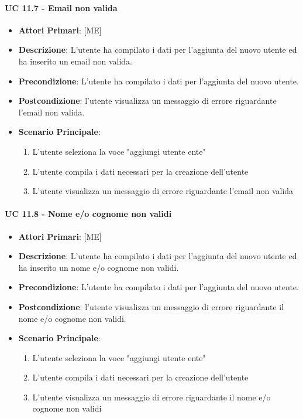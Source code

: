 			\paragraph{UC 11.7 - Email non valida}
			\begin{itemize}
				\item \textbf{Attori Primari}: [ME]
				\item \textbf{Descrizione}: L'utente ha compilato i dati per l'aggiunta del nuovo utente ed ha inserito un email non valida.
				\item \textbf{Precondizione}: L'utente ha compilato i dati per l'aggiunta del nuovo utente.
				\item \textbf{Postcondizione}: l'utente visualizza un messaggio di errore riguardante l'email non valida.
				\item \textbf{Scenario Principale}:
				\begin{enumerate}
					\item{L'utente seleziona la voce "aggiungi utente ente"}
					\item{L'utente compila i dati necessari per la creazione dell'utente}
					\item{L'utente visualizza un messaggio di errore riguardante l'email non valida}
				\end{enumerate}	
			\end{itemize}
			
			\paragraph{UC 11.8 - Nome e/o cognome non validi}
			\begin{itemize}
				\item \textbf{Attori Primari}: [ME]
				\item \textbf{Descrizione}: L'utente ha compilato i dati per l'aggiunta del nuovo utente ed ha inserito un nome e/o cognome non validi.
				\item \textbf{Precondizione}: L'utente ha compilato i dati per l'aggiunta del nuovo utente.
				\item \textbf{Postcondizione}: l'utente visualizza un messaggio di errore riguardante il nome e/o cognome non validi.
				\item \textbf{Scenario Principale}:
				\begin{enumerate}
					\item{L'utente seleziona la voce "aggiungi utente ente"}
					\item{L'utente compila i dati necessari per la creazione dell'utente}
					\item{L'utente visualizza un messaggio di errore riguardante il nome e/o cognome non validi}
				\end{enumerate}	
			\end{itemize}
			
